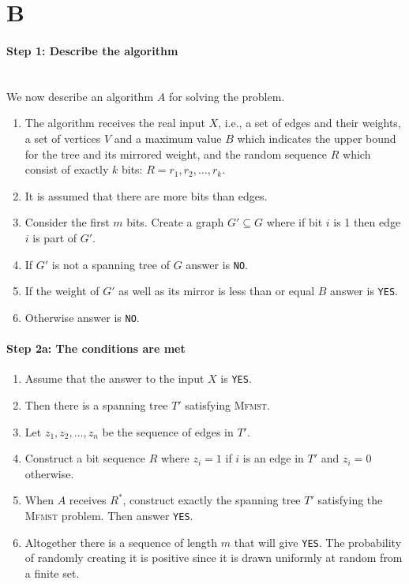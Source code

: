 \section{B}
\paragraph{Step 1: Describe the algorithm} \mbox{} \\
We now describe an algorithm $A$ for solving the problem.
\begin{enumerate}
    \item The algorithm receives the real input $X$, i.e., a set of edges and their weights, a set of vertices $V$ and a maximum value $B$ which indicates the upper bound for the tree and its mirrored weight, and the random sequence $R$ which consist of exactly $k$ bits: $R = r_1, r_2, \ldots, r_k$.
    \item It is assumed that there are more bits than edges.
    \item Consider the first $m$ bits. Create a graph $G' \subseteq G$ where if bit $i$ is 1 then edge $i$ is part of $G'$.
    \item If $G'$ is not a spanning tree of $G$ answer is \verb=NO=.
    \item If the weight of $G'$ as well as its mirror is less than or equal $B$ answer is \verb=YES=.
    \item Otherwise answer is \verb=NO=.
\end{enumerate}

\paragraph{Step 2a: The conditions are met} \mbox{}
\begin{enumerate}
    \item Assume that the answer to the input $X$ is \verb=YES=.
    \item Then there is a spanning tree $T'$ satisfying \textsc{Mfmst}.
    \item Let $z_1, z_2,\ldots,z_n$ be the sequence of edges in $T'$.
    \item Construct a bit sequence $R$ where $z_i = 1$ if $i$ is an edge in $T'$ and $z_i = 0$ otherwise.
    \item When $A$ receives $R^*$, construct exactly the spanning tree $T'$ satisfying the \textsc{Mfmst} problem. Then answer \verb=YES=. 
    \item Altogether there is a sequence of length $m$ that will give \verb=YES=. The probability of randomly creating it is positive since it is drawn uniformly at random from a finite set. 
\end{enumerate}


